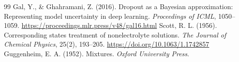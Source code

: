 \documentclass[11pt]{article}
\begin{document}
\begin{thebibliography}{99}
   Gal, Y., \& Ghahramani, Z. (2016). Dropout as a Bayesian approximation: Representing model uncertainty in deep learning. \textit{Proceedings of ICML}, 1050--1059. \url{https://proceedings.mlr.press/v48/gal16.html}
   Scott, R. L. (1956). Corresponding states treatment of nonelectrolyte solutions. \textit{The Journal of Chemical Physics}, 25(2), 193--205. \url{https://doi.org/10.1063/1.1742857}
   Guggenheim, E. A. (1952). Mixtures. \textit{Oxford University Press}.
\end{thebibliography}
\end{document}
